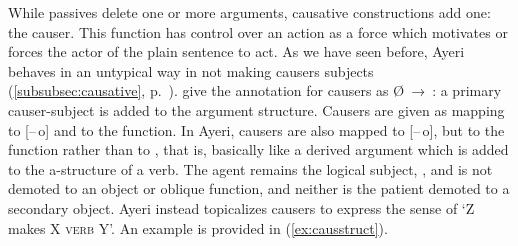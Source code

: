 While passives delete one or more arguments, causative constructions add one:
the causer. This function has control over an action as a force which motivates
or forces the actor of the plain sentence to act. As we have seen before, Ayeri
behaves in an untypical way in not making causers subjects
(\autoref{subsubsec:causative}, p.~\pageref{subsubsec:causative}).
\citet[342]{bresnan2016} give the annotation for causers as
Ø~→~\thetaroof{}: a primary causer-subject is added to the argument
structure. Causers are given as mapping to [–\,o] and to the \Subj{} function.
In Ayeri, causers are also mapped to [–\,o], but to the \Oblique{} function
rather than to \Subj{}, that is, basically like a derived argument which is
added to the a-structure of a verb. The agent remains the logical subject,
\thetaroof{}, and is not demoted to an object or oblique function, and neither
is the patient demoted to a secondary object. Ayeri instead topicalizes causers
to express the sense of `Z makes X \textsc{verb} Y'. An example is provided
in (\ref{ex:causstruct}).

